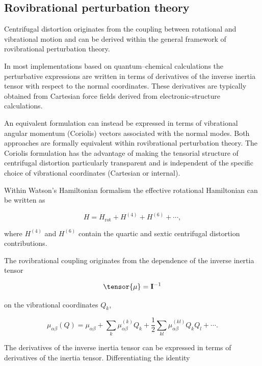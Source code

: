 \subsection{Rovibrational perturbation theory}

Centrifugal distortion originates from the coupling between rotational
and vibrational motion and can be derived within the general framework
of rovibrational perturbation theory.\cite{Watson1968,Watson1977,Nielsen1951,Mills1972}

In most implementations based on quantum--chemical calculations the
perturbative expressions are written in terms of derivatives of the
inverse inertia tensor with respect to the normal coordinates.
\cite{Clabo1988,StantonCFOUR,Gaw1991,Barone2005}
These derivatives are typically obtained from Cartesian force fields
derived from electronic-structure calculations.

An equivalent formulation can instead be expressed in terms of
vibrational angular momentum (Coriolis) vectors associated with the
normal modes.  Both approaches are formally equivalent within
rovibrational perturbation theory.  The Coriolis formulation has the
advantage of making the tensorial structure of centrifugal distortion
particularly transparent and is independent of the specific choice of
vibrational coordinates (Cartesian or internal).

Within Watson's Hamiltonian formalism the effective rotational
Hamiltonian can be written as

\begin{equation}
H = H_{\mathrm{rot}} + H^{(4)} + H^{(6)} + \cdots ,
\end{equation}

where $H^{(4)}$ and $H^{(6)}$ contain the quartic and sextic
centrifugal distortion contributions.

The rovibrational coupling originates from the dependence of the
inverse inertia tensor

\begin{equation}
\tensor{\mu} = \mathbf{I}^{-1}
\end{equation}

on the vibrational coordinates $Q_k$,

\begin{equation}
\mu_{\alpha\beta}(Q)
=
\mu_{\alpha\beta}
+
\sum_k
\mu_{\alpha\beta}^{(k)} Q_k
+
\frac12
\sum_{kl}
\mu_{\alpha\beta}^{(kl)} Q_k Q_l
+\cdots .
\end{equation}

The derivatives of the inverse inertia tensor can be expressed in
terms of derivatives of the inertia tensor. Differentiating the
identity

